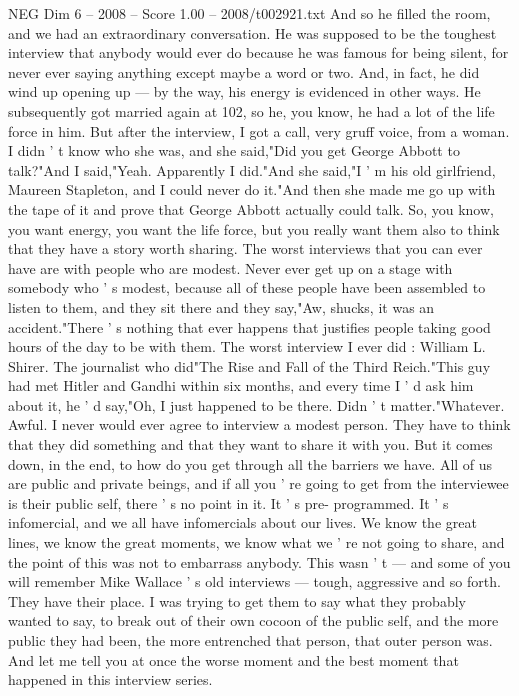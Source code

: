 \begin{textsample}{NEG Dim 6 – 2008 – Score 1.00 – 2008/t002921.txt}
And so he filled the room, and we had an extraordinary conversation.
He was supposed to be the toughest interview that anybody would ever do because he was famous for being silent, for never ever saying anything except maybe a word or two.
And, in fact, he did wind up opening up — by the way, his energy is evidenced in other ways.
He subsequently got married again at 102, so he, you know, he had a lot of the life force in him.
But after the interview, I got a call, very gruff voice, from a woman.
I didn ' t know who she was, and she said,"Did you get George Abbott to talk?"And I said,"Yeah.
Apparently I did."And she said,"I ' m his old girlfriend, Maureen Stapleton, and I could never do it."And then she made me go up with the tape of it and prove that George Abbott actually could talk.
So, you know, you want energy, you want the life force, but you really want them also to think that they have a story worth sharing.
The worst interviews that you can ever have are with people who are modest.
Never ever get up on a stage with somebody who ' s modest, because all of these people have been assembled to listen to them, and they sit there and they say,"Aw, shucks, it was an accident."There ' s nothing that ever happens that justifies people taking good hours of the day to be with them.
The worst interview I ever did : William L.
Shirer.
The journalist who did"The Rise and Fall of the Third Reich."This guy had met Hitler and Gandhi within six months, and every time I ' d ask him about it, he ' d say,"Oh, I just happened to be there.
Didn ' t matter."Whatever.
Awful.
I never would ever agree to interview a modest person.
They have to think that they did something and that they want to share it with you.
But it comes down, in the end, to how do you get through all the barriers we have.
All of us are public and private beings, and if all you ' re going to get from the interviewee is their public self, there ' s no point in it.
It ' s pre- programmed.
It ' s infomercial, and we all have infomercials about our lives.
We know the great lines, we know the great moments, we know what we ' re not going to share, and the point of this was not to embarrass anybody.
This wasn ' t — and some of you will remember Mike Wallace ' s old interviews — tough, aggressive and so forth.
They have their place.
I was trying to get them to say what they probably wanted to say, to break out of their own cocoon of the public self, and the more public they had been, the more entrenched that person, that outer person was.
And let me tell you at once the worse moment and the best moment that happened in this interview series.

\end{textsample}
